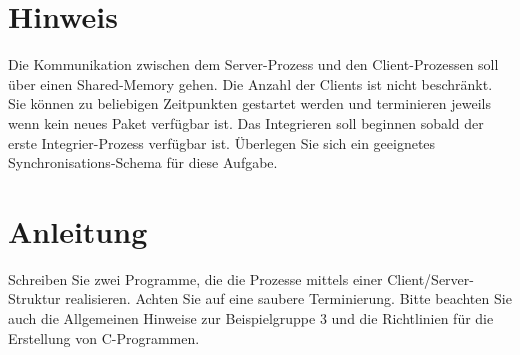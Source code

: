 \documentclass{article}
\begin{document}
\section*{Hinweis}
Die Kommunikation zwischen dem Server-Prozess und den Client-Prozessen soll über einen Shared-Memory gehen. Die Anzahl der Clients ist nicht beschränkt. Sie können zu beliebigen Zeitpunkten gestartet werden und terminieren jeweils wenn kein neues Paket verfügbar ist. Das Integrieren soll beginnen sobald der erste Integrier-Prozess verfügbar ist. Überlegen Sie sich ein geeignetes Synchronisations-Schema für diese Aufgabe.  

\section*{Anleitung}
Schreiben Sie zwei Programme, die die Prozesse mittels einer Client/Server-Struktur realisieren. Achten Sie auf eine saubere Terminierung.
Bitte beachten Sie auch die Allgemeinen Hinweise zur Beispielgruppe 3 und die Richtlinien
für die Erstellung von C-Programmen.
\end{document}

